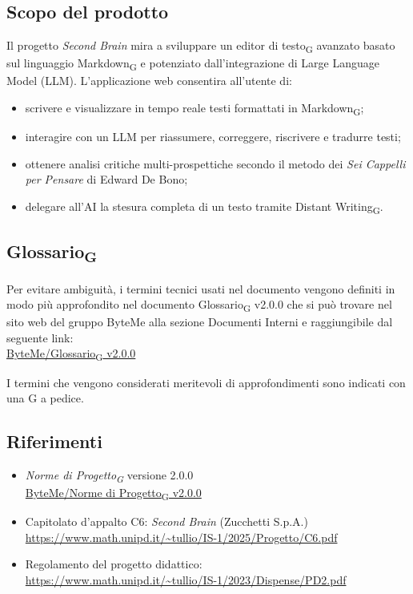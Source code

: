 \documentclass[11pt,a4paper]{article}
\newcommand{\gls}[1]{#1\textsubscript{G}}
\begin{document}
\subsection{Scopo del prodotto}
Il progetto \textit{Second Brain} mira a sviluppare un \gls{editor di testo} avanzato basato sul linguaggio \gls{Markdown} e potenziato dall'integrazione di Large Language Model (LLM).
L'applicazione web consentira all'utente di:
\begin{itemize}
  \item scrivere e visualizzare in tempo reale testi formattati in \gls{Markdown};
  \item interagire con un LLM per riassumere, correggere, riscrivere e tradurre testi;
  \item ottenere analisi critiche multi-prospettiche secondo il metodo dei \textit{Sei Cappelli per Pensare} di Edward De Bono;
  \item delegare all'AI la stesura completa di un testo tramite \gls{Distant Writing}.
\end{itemize}
 
\subsection{\gls{Glossario}}
Per evitare ambiguità, i termini tecnici usati nel documento vengono definiti in modo più approfondito nel documento \gls{Glossario} v2.0.0 che si può trovare nel sito web del gruppo ByteMe alla sezione Documenti Interni e raggiungibile dal seguente link:\\
\href{https://byteme25.github.io/ByteMe/files.html}{ByteMe/\gls{Glossario} v2.0.0}

I termini che vengono considerati meritevoli di approfondimenti sono indicati con una G a pedice.


\subsection{Riferimenti}
\begin{itemize}
  \item \textit{\gls{Norme di Progetto}} versione 2.0.0\\
  \href{https://byteme25.github.io/ByteMe/files.html}{ByteMe/\gls{Norme di Progetto} v2.0.0}
  \item Capitolato d'appalto C6: \textit{Second Brain} (Zucchetti S.p.A.)\\ \url{https://www.math.unipd.it/~tullio/IS-1/2025/Progetto/C6.pdf}
  \item Regolamento del progetto didattico:\\
        \url{https://www.math.unipd.it/~tullio/IS-1/2023/Dispense/PD2.pdf}
\end{itemize}
 
\end{document}

